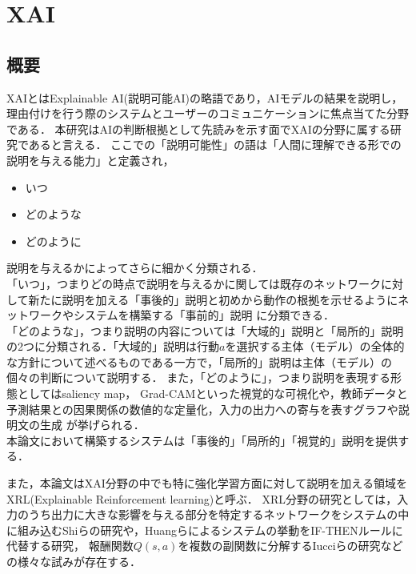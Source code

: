 \section{XAI}

\subsection{概要}
XAIとはExplainable AI(説明可能AI)の略語であり，AIモデルの結果を説明し，理由付けを行う際のシステムとユーザーのコミュニケーションに焦点当てた分野である\cite{consider}．
本研究はAIの判断根拠として先読みを示す面でXAIの分野に属する研究であると言える．
ここでの「説明可能性」の語は「人間に理解できる形での説明を与える能力」\cite{definition}と定義され，
\begin{itemize}
    \item いつ
    \item どのような
    \item どのように
\end{itemize}
説明を与えるかによってさらに細かく分類される．\\
「いつ」，つまりどの時点で説明を与えるかに関しては既存のネットワークに対して新たに説明を加える「事後的」説明と初めから動作の根拠を示せるようにネットワークやシステムを構築する「事前的」説明
に分類できる\cite{definition}．\\
「どのような」，つまり説明の内容については「大域的」説明と「局所的」説明の2つに分類される．「大域的」説明は行動$a$を選択する主体（モデル）の全体的な方針について述べるものである一方で，「局所的」説明は主体（モデル）の個々の判断について説明する\cite{gl}．
また，「どのように」，つまり説明を表現する形態としてはsaliency map\cite{saliency}， Grad-CAM\cite{Grad-CAM}といった視覚的な可視化や，教師データと予測結果との因果関係の数値的な定量化\cite{定量}，入力の出力への寄与を表すグラフや説明文の生成\cite{LIME}
が挙げられる．\\
本論文において構築するシステムは「事後的」「局所的」「視覚的」説明を提供する．

また，本論文はXAI分野の中でも特に強化学習方面に対して説明を加える領域をXRL(Explainable Reinforcement learning)と呼ぶ\cite{XRL}．
XRL分野の研究としては，入力のうち出力に大きな影響を与える部分を特定するネットワークをシステムの中に組み込むShiらの研究\cite{DBLP:journals/corr/abs-2003-07069}や，Huangらによるシステムの挙動をIF-THENルールに代替する研究\cite{Huang2020InterpretablePF}， 報酬関数$Q(s, a)$を複数の副関数に分解するIucciらの研究\cite{9659472}などの様々な試みが存在する．



